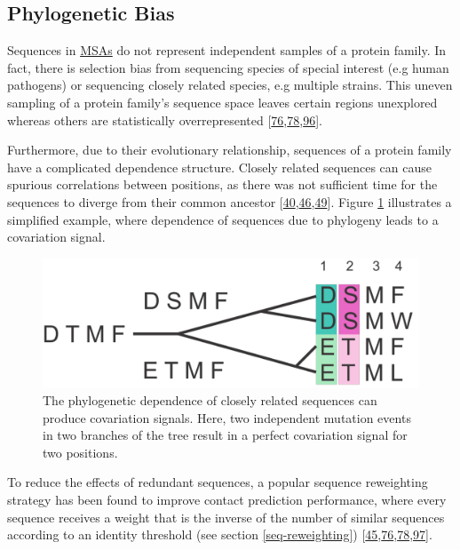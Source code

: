 \documentclass[12pt,a4paper,twoside]{book}
\theoremstyle{definition}
\theoremstyle{definition}
\theoremstyle{remark}
\begin{document}
\subsection*{Phylogenetic Bias}\label{phylogenetic-bias}

Sequences in \protect\hyperlink{abbrev}{MSAs} do not represent
independent samples of a protein family. In fact, there is selection
bias from sequencing species of special interest (e.g human pathogens)
or sequencing closely related species, e.g multiple strains. This uneven
sampling of a protein family's sequence space leaves certain regions
unexplored whereas others are statistically overrepresented
{[}\protect\hyperlink{ref-Morcos2011}{76},\protect\hyperlink{ref-Cocco2017}{78},\protect\hyperlink{ref-Marks2012}{96}{]}.

Furthermore, due to their evolutionary relationship, sequences of a
protein family have a complicated dependence structure. Closely related
sequences can cause spurious correlations between positions, as there
was not sufficient time for the sequences to diverge from their common
ancestor
{[}\protect\hyperlink{ref-Gouveia_Oliveira2007}{40},\protect\hyperlink{ref-Lapedes1999}{46},\protect\hyperlink{ref-Burger2010}{49}{]}.
Figure \ref{fig:phylogenetic-effect} illustrates a simplified example,
where dependence of sequences due to phylogeny leads to a covariation
signal.






\begin{figure}

{\centering \includegraphics[width=0.5\linewidth]{img/intro/phylogenetic_effect} 

}

\caption{The phylogenetic dependence of closely
related sequences can produce covariation signals. Here, two independent
mutation events in two branches of the tree result in a perfect
covariation signal for two positions.}\label{fig:phylogenetic-effect}
\end{figure}

To reduce the effects of redundant sequences, a popular sequence
reweighting strategy has been found to improve contact prediction
performance, where every sequence receives a weight that is the inverse
of the number of similar sequences according to an identity threshold
(see section \ref{seq-reweighting})
{[}\protect\hyperlink{ref-Jones2012}{45},\protect\hyperlink{ref-Morcos2011}{76},\protect\hyperlink{ref-Cocco2017}{78},\protect\hyperlink{ref-Buslje2009}{97}{]}.
\end{document}
